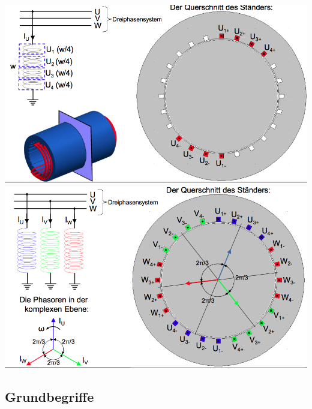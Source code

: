 \begin{minipage}{0.5 \linewidth}
\includegraphics[width = \linewidth]{./Pics/VL89/Drehfeld6}
\includegraphics[width = \linewidth]{./Pics/VL89/Drehfeld8}
\end{minipage}

\subsection{Grundbegriffe}


